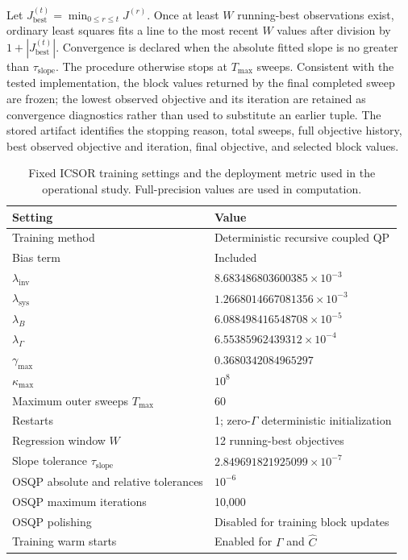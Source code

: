 \documentclass[a4paper,fleqn]{cas-sc}
\begin{document}
Let $J_{\mathrm{best}}^{(t)}=\min_{0\leq r\leq t}J^{(r)}$. Once at least $W$ running-best observations exist, ordinary least squares fits a line to the most recent $W$ values after division by $1+|J_{\mathrm{best}}^{(t)}|$. Convergence is declared when the absolute fitted slope is no greater than $\tau_{\mathrm{slope}}$. The procedure otherwise stops at $T_{\max}$ sweeps. Consistent with the tested implementation, the block values returned by the final completed sweep are frozen; the lowest observed objective and its iteration are retained as convergence diagnostics rather than used to substitute an earlier tuple. The stored artifact identifies the stopping reason, total sweeps, full objective history, best observed objective and iteration, final objective, and selected block values.

\begin{table}[H]
\centering
\caption{Fixed ICSOR training settings and the deployment metric used in the operational study. Full-precision values are used in computation.}
\label{tab:supp_icsor_settings}
\scriptsize
\begin{tabular}{ll}
\toprule
Setting & Value \\
\midrule
Training method & Deterministic recursive coupled QP \\
Bias term & Included \\
$\lambda_{\mathrm{inv}}$ & $8.683486803600385\times10^{-3}$ \\
$\lambda_{\mathrm{sys}}$ & $1.2668014667081356\times10^{-3}$ \\
$\lambda_B$ & $6.088498416548708\times10^{-5}$ \\
$\lambda_\Gamma$ & $6.55385962439312\times10^{-4}$ \\
$\gamma_{\max}$ & $0.3680342084965297$ \\
$\kappa_{\max}$ & $10^8$ \\
Maximum outer sweeps $T_{\max}$ & 60 \\
Restarts & 1; zero-$\Gamma$ deterministic initialization \\
Regression window $W$ & 12 running-best objectives \\
Slope tolerance $\tau_{\mathrm{slope}}$ & $2.849691821925099\times10^{-7}$ \\
OSQP absolute and relative tolerances & $10^{-6}$ \\
OSQP maximum iterations & 10,000 \\
OSQP polishing & Disabled for training block updates \\
Training warm starts & Enabled for $\Gamma$ and $\widehat C$ \\

\end{tabular}
\end{table}
\end{document}
